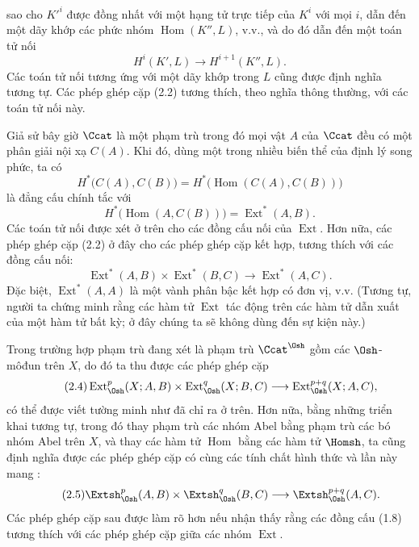 sao cho $K'^{i}$ được đồng nhất với một hạng tử trực tiếp của $K^{i}$ với mọi $i$,
dẫn đến một dãy khớp các phức nhóm $\operatorname{Hom}(K'',L)$, v.v., và do đó dẫn đến một
toán tử nối
\[
  H^{i}(K',L)\longrightarrow H^{i+1}(K'',L).
\]
Các toán tử nối tương ứng với một dãy khớp trong $L$ cũng được định nghĩa tương tự. Các
phép ghép cặp (2.2) tương thích, theo nghĩa thông thường, với các toán tử nối này.

Giả sử bây giờ $\Ccat$ là một phạm trù trong đó mọi vật $A$ của $\Ccat$
đều có một phân giải nội xạ $C(A)$. Khi đó, dùng một trong nhiều biến thể của định lý song phức, ta có
\[
  H^{*}\bigl(C(A),C(B)\bigr)
  =H^{*}\bigl(\operatorname{Hom}(C(A),C(B))\bigr)
\]
là đẳng cấu chính tắc với
\[
  H^{*}\bigl(\operatorname{Hom}(A,C(B))\bigr)
  =\operatorname{Ext}^{*}(A,B).
\]
Các toán tử nối được xét ở trên cho các đồng cấu nối của
$\operatorname{Ext}$. Hơn nữa, các phép ghép cặp (2.2) ở đây cho
các phép ghép cặp kết hợp, tương thích với các đồng cấu nối:
\begin{equation}\tag{2.3}
  \operatorname{Ext}^{*}(A,B)\times\operatorname{Ext}^{*}(B,C)
  \longrightarrow\operatorname{Ext}^{*}(A,C).
\end{equation}
Đặc biệt, $\operatorname{Ext}^{*}(A,A)$ là một vành phân bậc kết hợp
có đơn vị, v.v. (Tương tự, người ta chứng minh rằng các hàm tử
$\operatorname{Ext}$ tác động trên các hàm tử dẫn xuất của một hàm tử
bất kỳ; ở đây chúng ta sẽ không dùng đến sự kiện này.)

Trong trường hợp phạm trù đang xét là phạm trù $\Ccat^{\Osh}$ gồm các
$\Osh$-môđun trên $X$, do đó ta thu được các phép ghép cặp
\begin{equation}\tag{2.4}
  \operatorname{Ext}_{\Osh}^{p}(X;A,B)
  \times\operatorname{Ext}_{\Osh}^{q}(X;B,C)
  \longrightarrow\operatorname{Ext}_{\Osh}^{p+q}(X;A,C),
\end{equation}
có thể được viết tường minh như đã chỉ ra ở trên. Hơn nữa, bằng những triển khai tương tự,
trong đó thay phạm trù các nhóm Abel bằng phạm trù các bó nhóm Abel trên $X$, và thay các hàm tử
$\operatorname{Hom}$ bằng các hàm tử $\Homsh$, ta cũng định nghĩa được các phép ghép cặp có cùng
các tính chất hình thức và lần này mang :
\begin{equation}\tag{2.5}
  \Extsh_{\Osh}^{p}(A,B)\times\Extsh_{\Osh}^{q}(B,C)
  \longrightarrow\Extsh_{\Osh}^{p+q}(A,C).
\end{equation}
Các phép ghép cặp sau được làm rõ hơn nếu nhận thấy rằng các đồng cấu (1.8) tương thích
với các phép ghép cặp giữa các nhóm $\operatorname{Ext}$.

